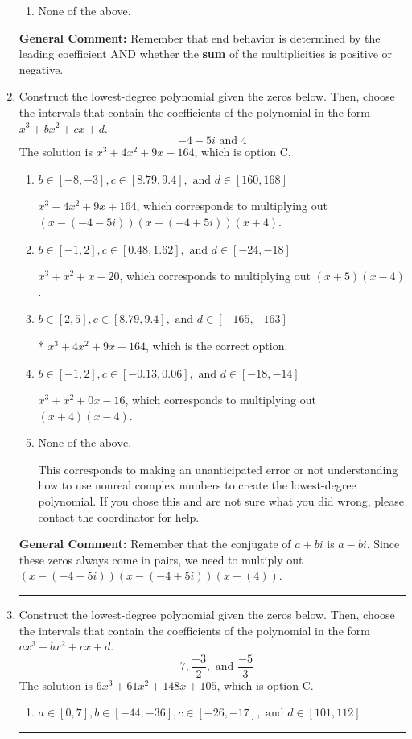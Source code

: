 \documentclass{extbook}[14pt]
\newcommand{\litem}[1]{\item #1

\rule{\textwidth}{0.4pt}}
\begin{document}
\begin{enumerate}
{\begin{enumerate}[label=\Alph*.]
\begin{multicols}{2}
\end{multicols}\item None of the above.\end{enumerate}
\textbf{General Comment:} Remember that end behavior is determined by the leading coefficient AND whether the \textbf{sum} of the multiplicities is positive or negative.
}
\litem{
Construct the lowest-degree polynomial given the zeros below. Then, choose the intervals that contain the coefficients of the polynomial in the form $x^3+bx^2+cx+d$.
\[ -4 - 5 i \text{ and } 4 \]The solution is \( x^{3} +4 x^{2} +9 x -164 \), which is option C.\begin{enumerate}[label=\Alph*.]
\item \( b \in [-8, -3], c \in [8.79, 9.4], \text{ and } d \in [160, 168] \)

$x^{3} -4 x^{2} +9 x + 164$, which corresponds to multiplying out $(x-(-4 - 5 i))(x-(-4 + 5 i))(x + 4)$.
\item \( b \in [-1, 2], c \in [0.48, 1.62], \text{ and } d \in [-24, -18] \)

$x^{3} + x^{2} +x -20$, which corresponds to multiplying out $(x + 5)(x -4)$.
\item \( b \in [2, 5], c \in [8.79, 9.4], \text{ and } d \in [-165, -163] \)

* $x^{3} +4 x^{2} +9 x -164$, which is the correct option.
\item \( b \in [-1, 2], c \in [-0.13, 0.06], \text{ and } d \in [-18, -14] \)

$x^{3} + x^{2} +0 x -16$, which corresponds to multiplying out $(x + 4)(x -4)$.
\item \( \text{None of the above.} \)

This corresponds to making an unanticipated error or not understanding how to use nonreal complex numbers to create the lowest-degree polynomial. If you chose this and are not sure what you did wrong, please contact the coordinator for help.
\end{enumerate}

\textbf{General Comment:} Remember that the conjugate of $a+bi$ is $a-bi$. Since these zeros always come in pairs, we need to multiply out $(x-(-4 - 5 i))(x-(-4 + 5 i))(x-(4))$.
}
\litem{
Construct the lowest-degree polynomial given the zeros below. Then, choose the intervals that contain the coefficients of the polynomial in the form $ax^3+bx^2+cx+d$.
\[ -7, \frac{-3}{2}, \text{ and } \frac{-5}{3} \]The solution is \( 6x^{3} +61 x^{2} +148 x + 105 \), which is option C.\begin{enumerate}[label=\Alph*.]
\item \( a \in [0, 7], b \in [-44, -36], c \in [-26, -17], \text{ and } d \in [101, 112] \)


\end{enumerate}}
\end{enumerate}
\end{document}
